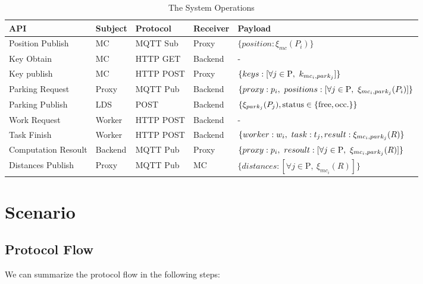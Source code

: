 \documentclass[12pt,a4paper,twoside]{book}
\begin{document}
\begin{table}[h]
\renewcommand{\arraystretch}{1.3}
\small
\begin{tabularx}{\linewidth}{|l|X|X|X|p{4cm}|}
\hline
\textbf{API} & \textbf{Subject} & \textbf{Protocol} & \textbf{Receiver} & \textbf{Payload} \\ \hline
Position Publish & MC & MQTT Sub & Proxy & $\{position: \xi_{mc}( P_i )\}$ \\ \hline
Key Obtain & MC & HTTP GET & Backend & - \\ \hline
Key publish & MC & HTTP POST & Proxy & $\{keys: \newline [\forall j \in \text{P},\ k_{mc_i, park_j}]\}$ \\ \hline
Parking Request & Proxy & MQTT Pub & Backend &
$\{proxy: p_i,\ positions: \newline [\forall j \in \text{P},\ \xi_{mc_i, park_j}(P_i)]\}$ \\ \hline
Parking Publish & LDS & POST & Backend & $\{\xi_{park_j}(P_j),\newline \text{status} \in \{\text{free}, \text{occ.}\}\}$ \\ \hline
Work Request & Worker & HTTP POST & Backend & - \\ \hline
Task Finish & Worker & HTTP POST & Backend & $\{worker: w_i,\ task: t_j,\newline result: \xi_{mc_i, park_j}(R)\}$ \\ \hline
Computation Resoult & Backend & MQTT Pub & Proxy & $\{proxy: p_i,\ resoult: \newline [\forall j \in \text{P},\ \xi_{mc_i, park_j}(R)]\}$ \\ \hline
Distances Publish & Proxy & MQTT Pub & MC & $\{distances: [\forall j \in \text{P},\ \xi_{mc_i}(R)]\}$ \\ \hline
\end{tabularx}
\caption{The System Operations}
\label{table:system-operations}
\end{table}

\section{Scenario}
\subsection{Protocol Flow}
We can summarize the protocol flow in the following steps:
\end{document}
